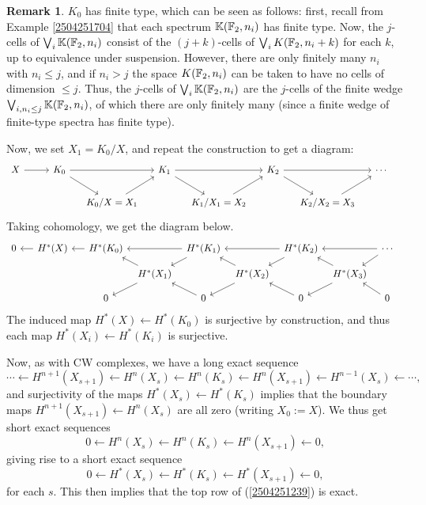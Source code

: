 \documentclass[11pt, titlepage]{article} %
\def\bb{\ensuremath\mathbb}
\numberwithin{equation}{subsection}
\theoremstyle{plain}
\theoremstyle{definition}
\newtheorem{remark}[theorem]{Remark}
\begin{document}
\begin{remark}
\(K_0\) has finite type, which can be seen as follows: first, recall from Example \ref{2504251704} that each spectrum \(\bb{K}(\bb{F}_2, n_i)\) has finite type. Now, the \(j\)-cells of \(\bigvee_i \bb{K}(\bb{F}_2, n_i)\) consist of the \((j+k)\)-cells of \(\bigvee_i K(\bb{F}_2, n_i+k)\) for each \(k\), up to equivalence under suspension. However, there are only finitely many \(n_i\) with \(n_i\leq j\), and if \(n_i>j\) the space \(K(\bb{F}_2, n_i)\) can be taken to have no cells of dimension \(\leq j\). Thus, the \(j\)-cells of \(\bigvee_i \bb{K}(\bb{F}_2, n_i)\) are the \(j\)-cells of the finite wedge \(\bigvee_{i, n_i\leq j}\bb{K}(\bb{F}_2, n_i)\), of which there are only finitely many (since a finite wedge of finite-type spectra has finite type). 
\end{remark}

Now, we set \(X_1=K_0/X\), and repeat the construction to get a diagram:
\begin{equation}\label{2503301114}
\begin{tikzcd}[column sep=3ex, row sep=4ex] 
 X \arrow[rr, ""]  & & K_0 \arrow[rr, ""] \arrow[dr, ""] & & K_1 \arrow[dr, ""] \arrow[rr, ""] & & K_2 \arrow[dr, ""] \arrow[rr, ""] & & \cdots \\ 
  &&& K_0/X=X_1 \arrow[ur, ""] & & K_1/X_1=X_2 \arrow[ur, ""] & & K_2/X_2=X_3 \arrow[ur, ""] &  &
 \end{tikzcd}\nonumber
\end{equation}
Taking cohomology, we get the diagram below.
\begin{equation}\label{2504251239}
\begin{tikzcd}[column sep=1.5ex, row sep = 2ex, arrows=<-]
 0 \arrow[rr, ""] && H^*(X) \arrow[rr,""] & & H^*(K_0) \arrow[rr, ""] \arrow[dr, ""] & & H^*(K_1) \arrow[dr, ""] \arrow[rr, ""] & & H^*(K_2) \arrow[dr, ""] \arrow[rr, ""] & & \cdots \\ 
  &&&&& H^*(X_1) \arrow[ur, ""] \arrow[dr] & & H^*(X_2) \arrow[ur, ""] \arrow[dr] & & H^*(X_3) \arrow[ur, ""] \arrow[dr] &  &\\
&&&& 0 \arrow[ur] && 0 \arrow[ur] && 0 \arrow[ur] && 0
 \end{tikzcd}
\end{equation}
The induced map \(H^*(X)\leftarrow H^*(K_0)\) is surjective by construction, and thus each map \(H^*(X_i)\leftarrow H^*(K_i)\) is surjective. 

Now, as with CW complexes, we have a long exact sequence
\[\cdots \leftarrow H^{n+1}(X_{s+1})\leftarrow H^n(X_{s})\leftarrow H^n(K_s)\leftarrow H^n(X_{s+1})\leftarrow H^{n-1}(X_s)\leftarrow \cdots,\]
and surjectivity of the maps \(H^*(X_s)\leftarrow H^*(K_s)\) implies that the boundary maps \(H^{n+1}(X_{s+1})\leftarrow H^n(X_s)\) are all zero (writing \(X_0:=X\)). We thus get short exact sequences
\[0\leftarrow H^n(X_{s})\leftarrow H^n(K_s)\leftarrow H^n(X_{s+1})\leftarrow0,\]
giving rise to a short exact sequence
\[0\leftarrow H^*(X_{s})\leftarrow H^*(K_s)\leftarrow H^*(X_{s+1})\leftarrow0,\]
for each \(s\). This then implies that the top row of (\ref{2504251239}) is exact.
\end{document}
